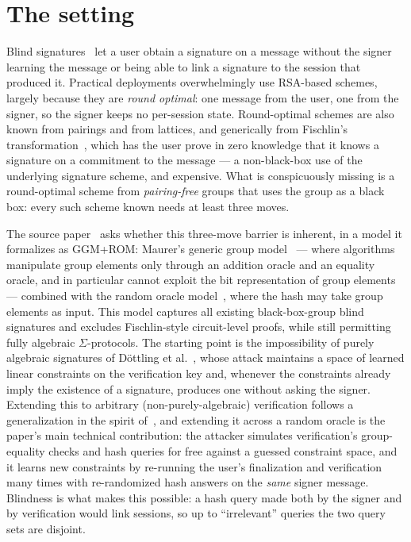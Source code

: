 \documentclass{conjura-conjecture}
\begin{document}
\section{The setting}\label{sec:setting}

Blind signatures~\cite{Cha82} let a user obtain a signature on a message
without the signer learning the message or being able to link a
signature to the session that produced it. Practical deployments
overwhelmingly use RSA-based schemes, largely because they are
\emph{round optimal}: one message from the user, one from the signer, so
the signer keeps no per-session state. Round-optimal schemes are also
known from pairings and from lattices, and generically from Fischlin's
transformation~\cite{Fis06}, which has the user prove in zero knowledge
that it knows a signature on a commitment to the message --- a
non-black-box use of the underlying signature scheme, and expensive.
What is conspicuously missing is a round-optimal scheme from
\emph{pairing-free} groups that uses the group as a black box: every
such scheme known needs at least three moves.

The source paper~\cite{DKT26} asks whether this three-move barrier is
inherent, in a model it formalizes as GGM+ROM: Maurer's generic group
model~\cite{Mau05} --- where algorithms manipulate group elements only
through an addition oracle and an equality oracle, and in particular
cannot exploit the bit representation of group elements --- combined
with the random oracle model~\cite{BR93}, where the hash may take group
elements as input. This model captures all existing black-box-group
blind signatures and excludes Fischlin-style circuit-level proofs, while
still permitting fully algebraic $\Sigma$-protocols. The starting point
is the impossibility of purely algebraic signatures of D\"ottling et
al.~\cite{DHHKSU}, whose attack maintains a space of learned linear
constraints on the verification key and, whenever the constraints
already imply the existence of a signature, produces one without asking
the signer. Extending this to arbitrary (non-purely-algebraic)
verification follows a generalization in the spirit of~\cite{CFGG22},
and extending it across a random oracle is the paper's main technical
contribution: the attacker simulates verification's group-equality
checks and hash queries for free against a guessed constraint space, and
it learns new constraints by re-running the user's finalization and
verification many times with re-randomized hash answers on the
\emph{same} signer message. Blindness is what makes this possible: a
hash query made both by the signer and by verification would link
sessions, so up to ``irrelevant'' queries the two query sets are
disjoint.
\end{document}
